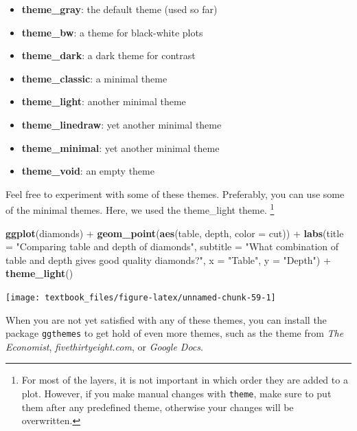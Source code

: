 \documentclass[]{tufte-book}
\newenvironment{Shaded}{}{}
\newcommand{\DataTypeTok}[1]{\textcolor[rgb]{0.56,0.13,0.00}{#1}}
\newcommand{\KeywordTok}[1]{\textcolor[rgb]{0.00,0.44,0.13}{\textbf{#1}}}
\newcommand{\NormalTok}[1]{#1}
\newcommand{\OperatorTok}[1]{\textcolor[rgb]{0.40,0.40,0.40}{#1}}
\newcommand{\StringTok}[1]{\textcolor[rgb]{0.25,0.44,0.63}{#1}}
\providecommand{\tightlist}{%
  \setlength{\itemsep}{0pt}\setlength{\parskip}{0pt}}
\begin{document}
\begin{itemize}
\tightlist
\item
  \textbf{theme\_gray}: the default theme (used so far)
\item
  \textbf{theme\_bw}: a theme for black-white plots
\item
  \textbf{theme\_dark}: a dark theme for contrast
\item
  \textbf{theme\_classic}: a minimal theme
\item
  \textbf{theme\_light}: another minimal theme
\item
  \textbf{theme\_linedraw}: yet another minimal theme
\item
  \textbf{theme\_minimal}: yet another minimal theme
\item
  \textbf{theme\_void}: an empty theme
\end{itemize}

Feel free to experiment with some of these themes. Preferably, you can use some of the minimal themes. Here, we used the theme\_light theme. \footnote{For most of the layers, it is not important in which order they are added to a plot. However, if you make manual changes with \texttt{theme}, make sure to put them after any predefined theme, otherwise your changes will be overwritten.}

\begin{Shaded}
\begin{Highlighting}[]
\KeywordTok{ggplot}\NormalTok{(diamonds) }\OperatorTok{+}
\StringTok{    }\KeywordTok{geom_point}\NormalTok{(}\KeywordTok{aes}\NormalTok{(table, depth, }\DataTypeTok{color =}\NormalTok{ cut)) }\OperatorTok{+}\StringTok{ }
\StringTok{    }\KeywordTok{labs}\NormalTok{(}\DataTypeTok{title =} \StringTok{"Comparing table and depth of diamonds"}\NormalTok{,}
         \DataTypeTok{subtitle =} \StringTok{"What combination of table and depth gives good quality diamonds?"}\NormalTok{,}
         \DataTypeTok{x =} \StringTok{"Table"}\NormalTok{,}
         \DataTypeTok{y =} \StringTok{"Depth"}\NormalTok{) }\OperatorTok{+}
\StringTok{    }\KeywordTok{theme_light}\NormalTok{()}
\end{Highlighting}
\end{Shaded}

\texttt{[image: textbook\_files/figure-latex/unnamed-chunk-59-1]}

When you are not yet satisfied with any of these themes, you can install the package \texttt{ggthemes} to get hold of even more themes, such as the theme from \emph{The Economist}, \emph{fivethirtyeight.com}, or \emph{Google Docs}.
\end{document}
